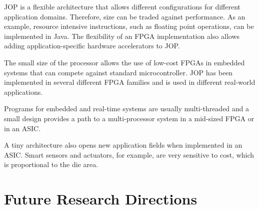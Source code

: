 JOP is a flexible architecture that allows different configurations
for different application domains. Therefore, size can be traded
against performance. As an example, resource intensive instructions,
such as floating point operations, can be implemented in Java. The
flexibility of an FPGA implementation also allows adding
application-specific hardware accelerators to JOP.

The small size of the processor allows the use of low-cost FPGAs in
embedded systems that can compete against standard microcontroller.
JOP has been implemented in several different FPGA families and is
used in different real-world applications.

Programs for embedded and real-time systems are usually
multi-threaded and a small design provides a path to a
multi-processor system in a mid-sized FPGA or in an ASIC.

A tiny architecture also opens new application fields when
implemented in an ASIC. Smart sensors and actuators, for example,
are very sensitive to cost, which is proportional to the die area.


\section{Future Research Directions}

